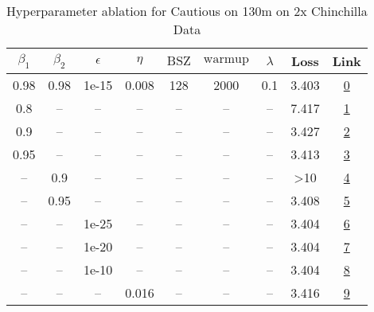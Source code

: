 \begin{table}[H]
\centering
\caption{Hyperparameter ablation for Cautious on 130m on 2x Chinchilla Data}
\label{tab:ablation_cautious_130m_2}
\begin{tabular}{ccccccccc}
\toprule
$\beta_1$ & $\beta_2$ & $\epsilon$ & $\eta$ & $\mathrm{BSZ}$ & $\mathrm{warmup}$ & $\lambda$ & Loss & Link \\
\midrule
0.98 & 0.98 & 1e-15 & 0.008 & 128 & 2000 & 0.1 & 3.403 & \href{https://wandb.ai/stanford-mercury/optimizer-scaling/runs/sweep-130m-5B-cautiousce8123lr0.008-wd0.1-minlr0-warmup2000-b10.-fd1867}{0} \\
\midrule
0.8 & -- & -- & -- & -- & -- & -- & 7.417 & \href{https://wandb.ai/stanford-mercury/optimizer-scaling/runs/sweep-130m-5B-cautious4f3b8flr0.008-wd0.1-minlr0-warmup2000-b10.-ef7ead}{1} \\
0.9 & -- & -- & -- & -- & -- & -- & 3.427 & \href{https://wandb.ai/stanford-mercury/optimizer-scaling/runs/sweep-130m-5B-cautious585d63lr0.008-wd0.1-minlr0-warmup2000-b10.-6158ce}{2} \\
0.95 & -- & -- & -- & -- & -- & -- & 3.413 & \href{https://wandb.ai/stanford-mercury/optimizer-scaling/runs/sweep-130m-5B-cautious5d7675lr0.008-wd0.1-minlr0-warmup2000-b10.-76a83d}{3} \\
-- & 0.9 & -- & -- & -- & -- & -- & >10 & \href{https://wandb.ai/stanford-mercury/optimizer-scaling/runs/sweep-130m-5B-cautious6aa3ablr0.008-wd0.1-minlr0-warmup2000-b10.-752115}{4} \\
-- & 0.95 & -- & -- & -- & -- & -- & 3.408 & \href{https://wandb.ai/stanford-mercury/optimizer-scaling/runs/sweep-130m-5B-cautious35372elr0.008-wd0.1-minlr0-warmup2000-b10.-681c2f}{5} \\
-- & -- & 1e-25 & -- & -- & -- & -- & 3.404 & \href{https://wandb.ai/stanford-mercury/optimizer-scaling/runs/sweep-130m-5B-cautiousedcc52lr0.008-wd0.1-minlr0-warmup2000-b10.-57f831}{6} \\
-- & -- & 1e-20 & -- & -- & -- & -- & 3.404 & \href{https://wandb.ai/stanford-mercury/optimizer-scaling/runs/sweep-130m-5B-cautious8f8214lr0.008-wd0.1-minlr0-warmup2000-b10.-b716f2}{7} \\
-- & -- & 1e-10 & -- & -- & -- & -- & 3.404 & \href{https://wandb.ai/stanford-mercury/optimizer-scaling/runs/sweep-130m-5B-cautious78002elr0.008-wd0.1-minlr0-warmup2000-b10.-a041fe}{8} \\
-- & -- & -- & 0.016 & -- & -- & -- & 3.416 & \href{https://wandb.ai/stanford-mercury/optimizer-scaling/runs/sweep-130m-5B-cautious0d244clr0.016-wd0.1-minlr0-warmup2000-b10.-f8a9e5}{9} \\

\end{tabular}
\end{table}
